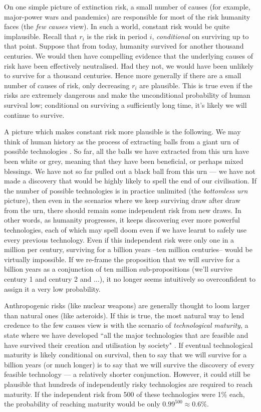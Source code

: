 \documentclass[british]{article}
\begin{document}
On one simple picture of extinction risk, a small number of causes (for example, major-power wars and pandemics) are responsible for most of the risk humanity faces (the \emph{few causes} view).  In such a world, constant risk would be quite implausible. Recall that $r_i$ is the risk in period $i$, \emph{conditional} on surviving up to that point. Suppose that from today, humanity survived for another thousand centuries. We would then have compelling evidence that the underlying causes of risk have been effectively neutralised. Had they not, we would have been unlikely to survive for a thousand centuries. Hence more generally if there are a small number of causes of risk, only decreasing $r_i$ are plausible. This is true even if the risks are extremely dangerous and make the unconditional probability of human survival low; conditional on surviving a sufficiently long time, it's likely we will continue to survive.

A picture which makes constant risk more plausible is the following. We may think of human history as the process of extracting balls from a giant urn of possible technologies \citep{bostrom_existential_2013}. So far, all the balls we have extracted from this urn have been white or grey, meaning that they have been beneficial, or perhaps mixed blessings. We have not so far pulled out a black ball from this urn --- we have not made a discovery that would be highly likely to spell the end of our civilisation. If the number of possible technologies is in practice unlimited (the \emph{bottomless urn} picture), then even in the scenarios where we keep surviving draw after draw from the urn, there should remain some independent risk from new draws. In other words, as humanity progresses, it keeps discovering ever more powerful technologies, each of which may spell doom even if we have learnt to safely use every previous technology. Even if this independent risk were only one in a million per century, surviving for a billion years --ten million centuries-- would be virtually impossible. If we re-frame the proposition that we will survive for a billion years as a conjunction of ten million sub-propositions (we'll survive century 1 and century 2 and ...), it no longer seems intuitively so overconfident to assign it a very low probability.

Anthropogenic risks (like nuclear weapons) are generally thought to loom larger than natural ones (like asteroids). If this is true, the most natural way to lend credence to the few causes view is with the scenario of \emph{technological maturity}, a state where we have developed ``all the major technologies that are feasible and have survived their creation and utilisation by society" \citep{ord_modelling_2014}. If eventual technological maturity is likely conditional on survival, then to say that we will survive for a billion years (or much longer) is to say that we will survive the discovery of every feasible technology --- a relatively shorter conjunction. However, it could still be plausible that hundreds of independently risky technologies are required to reach maturity. If the independent risk from 500 of these technologies were 1\% each, the probability of reaching maturity would be only $0.99^{500}\approx0.6\%$.
\end{document}
